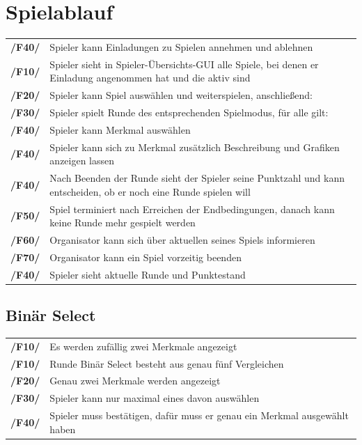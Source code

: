 \documentclass[a4paper]{scrreprt}
\begin{document}
    \section{Spielablauf} 
    \begin{tabularx}{\linewidth}{@{}>{\bfseries}l@{\hspace{.5em}}X@{}} %
    	/F40/ & \Gls{Spieler} kann Einladungen zu Spielen annehmen und ablehnen \\
    	/F10/ & \Gls{Spieler} sieht in Spieler-Übersichts-GUI alle Spiele, bei denen er Einladung angenommen hat und die aktiv sind \\
    	/F20/ & \Gls{Spieler} kann Spiel auswählen und weiterspielen, anschließend: \\
    	/F30/ & \Gls{Spieler} spielt Runde des entsprechenden \Gls{Spielmodus}, für alle gilt: \\
    	/F40/ & \Gls{Spieler} kann Merkmal auswählen \\
    	/F40/ & \Gls{Spieler} kann sich zu Merkmal zusätzlich Beschreibung und Grafiken anzeigen lassen \\
    	/F40/ & Nach Beenden der Runde sieht der \Gls{Spieler} seine Punktzahl und kann entscheiden, ob er noch eine Runde spielen will \\
	/F50/ & Spiel terminiert nach Erreichen der Endbedingungen, danach kann keine Runde mehr gespielt werden \\
	/F60/ & \Gls{Organisator} kann sich über aktuellen seines Spiels informieren \\ %
	/F70/ & \Gls{Organisator} kann ein Spiel vorzeitig beenden \\
	/F40/ & \Gls{Spieler} sieht aktuelle Runde und Punktestand \\
    \end{tabularx}
    
    \subsection{Binär Select}
    \begin{tabularx}{\linewidth}{@{}>{\bfseries}l@{\hspace{.5em}}X@{}} %
    	/F10/ & Es werden zufällig zwei Merkmale angezeigt \\
    	/F10/ & Runde Binär Select besteht aus genau fünf Vergleichen \\
    	/F20/ & Genau zwei Merkmale werden angezeigt \\
    	/F30/ & \Gls{Spieler} kann nur maximal eines davon auswählen \\
    	/F40/ & \Gls{Spieler} muss bestätigen, dafür muss er genau ein Merkmal ausgewählt haben \\
    \end{tabularx}
\end{document}

